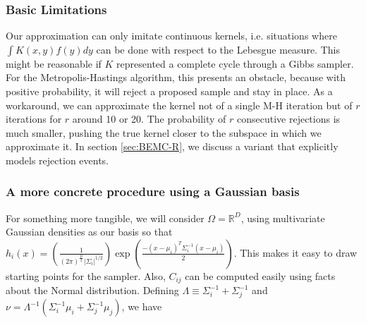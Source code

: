\documentclass{article}
\begin{document}
\subsubsection{Basic Limitations}
Our approximation can only imitate continuous kernels, i.e. situations where $\int K(x,y)f(y)dy$ can be done with respect to the Lebesgue measure. This might be reasonable if $K$ represented a complete cycle through a Gibbs sampler. For the Metropolis-Hastings algorithm, this presents an obstacle, because with positive probability, it will reject a proposed sample and stay in place. As a workaround, we can approximate the kernel not of a single M-H iteration but of $r$ iterations for $r$ around 10 or 20. The probability of $r$ consecutive rejections is much smaller, pushing the true kernel closer to the subspace in which we approximate it. In section \ref{sec:BEMC-R}, we discuss a variant that explicitly models rejection events.

\subsubsection{A more concrete procedure using a Gaussian basis}
\label{sec: BEMC_concrete}
For something more tangible, we will consider $\Omega=\mathbb{R}^D$, using multivariate Gaussian densities as our basis so that $h_i(x)= (\frac{1}{(2\pi)^{\frac{D}{2}} |\Sigma_i|^{1/2}})\exp(\frac{-(x-\mu_i)^T\Sigma_i^{-1}(x-\mu_i)}{2})$. This makes it easy to draw starting points for the sampler. Also, $C_{ij}$ can be computed easily using facts about the Normal distribution. Defining $\Lambda \equiv \Sigma_i^{-1} + \Sigma_j^{-1}$ and $\nu = \Lambda^{-1} (\Sigma_i^{-1}\mu_i + \Sigma_j^{-1}\mu_j)$, we have
\end{document}

